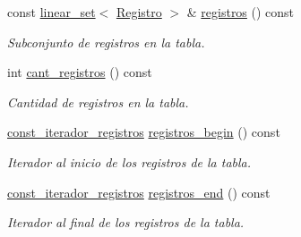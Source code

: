 \begin{DoxyCompactItemize}
const \mbox{\hyperlink{classlinear__set}{linear\+\_\+set}}$<$ \mbox{\hyperlink{classRegistro}{Registro}} $>$ \& \mbox{\hyperlink{classTabla_a11b94420ed8fa905471a34b41a5191ad}{registros}} () const
\begin{DoxyCompactList}\small\item\em Subconjunto de registros en la tabla. \end{DoxyCompactList}\item 
int \mbox{\hyperlink{classTabla_a89ec62f42350f3b40bb1d578b4934fc6}{cant\+\_\+registros}} () const
\begin{DoxyCompactList}\small\item\em Cantidad de registros en la tabla. \end{DoxyCompactList}\item 
\mbox{\hyperlink{classTabla_1_1const__iterador__registros}{const\+\_\+iterador\+\_\+registros}} \mbox{\hyperlink{classTabla_abbae06c74157e0ddfe66796a78bb2c65}{registros\+\_\+begin}} () const
\begin{DoxyCompactList}\small\item\em Iterador al inicio de los registros de la tabla. \end{DoxyCompactList}\item 
\mbox{\hyperlink{classTabla_1_1const__iterador__registros}{const\+\_\+iterador\+\_\+registros}} \mbox{\hyperlink{classTabla_a0dbdc0d601d5963f38df24367e373e53}{registros\+\_\+end}} () const
\begin{DoxyCompactList}\small\item\em Iterador al final de los registros de la tabla. \end{DoxyCompactList}\end{DoxyCompactItemize}
